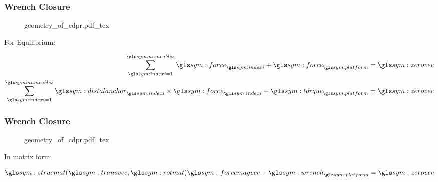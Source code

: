 \documentclass{beamer}
\begin{document}
	\begin{frame}
		\frametitle{Wrench Closure}
		\begin{figure}[hb]
			\centering
			\def\svgwidth{\columnwidth}
			{geometry_of_cdpr.pdf_tex}
		\end{figure}

		For Equilibrium:

        \begin{align}
            \sum_{\indexi = 1}^{\numcables}
                \force_{\indexi} +
            \force_{\platform} &= \zerovec \\
            \sum_{\indexi = 1}^{\numcables}
                \distalanchor_{\indexi} \times \force_{\indexi} +
            \torque_{\platform} &= \zerovec
        \end{align}
	\end{frame}

	\begin{frame}
		\frametitle{Wrench Closure}
		\begin{figure}[hb]
			\centering
			\def\svgwidth{\columnwidth}
			{geometry_of_cdpr.pdf_tex}
		\end{figure}

		In matrix form:

        \begin{equation}
            \strucmat(\transvec, \rotmatbare)\forcemagvec +
            \wrench_{\platform} = \zerovec
            \label{eq:structure_equation}
        \end{equation}

	\end{frame}
\end{document}
